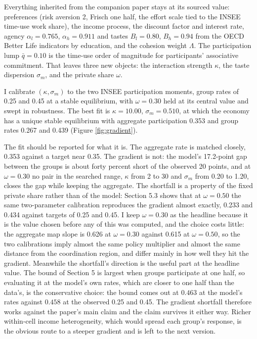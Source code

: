\documentclass[11pt]{article}
\begin{document}
Everything inherited from the companion paper stays at its sourced value: preferences (risk aversion 2, Frisch one half, the effort scale tied to the INSEE time-use work share), the income process, the discount factor and interest rate, agency $\alpha_l = 0.765$, $\alpha_h = 0.911$ and tastes $B_l = 0.80$, $B_h = 0.94$ from the OECD Better Life indicators by education, and the cohesion weight $\Lambda$. The participation lump $\bar{q} = 0.10$ is the time-use order of magnitude for participants' associative commitment. That leaves three new objects: the interaction strength $\kappa$, the taste dispersion $\sigma_m$, and the private share $\omega$.

I calibrate $(\kappa, \sigma_m)$ to the two INSEE participation moments, group rates of 0.25 and 0.45 at a stable equilibrium, with $\omega = 0.30$ held at its central value and swept in robustness. The best fit is $\kappa = 10.00$, $\sigma_m = 0.510$, at which the economy has a unique stable equilibrium with aggregate participation 0.353 and group rates 0.267 and 0.439 (Figure \ref{fig:gradient}).

The fit should be reported for what it is. The aggregate rate is matched closely, 0.353 against a target near 0.35. The gradient is not: the model's 17.2-point gap between the groups is about forty percent short of the observed 20 points, and at $\omega = 0.30$ no pair in the searched range, $\kappa$ from 2 to 30 and $\sigma_m$ from 0.20 to 1.20, closes the gap while keeping the aggregate. The shortfall is a property of the fixed private share rather than of the model: Section 5.3 shows that at $\omega = 0.50$ the same two-parameter calibration reproduces the gradient almost exactly, 0.233 and 0.434 against targets of 0.25 and 0.45. I keep $\omega = 0.30$ as the headline because it is the value chosen before any of this was computed, and the choice costs little: the aggregate map slope is 0.626 at $\omega = 0.30$ against 0.615 at $\omega = 0.50$, so the two calibrations imply almost the same policy multiplier and almost the same distance from the coordination region, and differ mainly in how well they hit the gradient. Meanwhile the shortfall's direction is the useful part at the headline value. The bound of Section 5 is largest when groups participate at one half, so evaluating it at the model's own rates, which are closer to one half than the data's, is the conservative choice: the bound comes out at $0.463$ at the model's rates against $0.458$ at the observed 0.25 and 0.45. The gradient shortfall therefore works against the paper's main claim and the claim survives it either way. Richer within-cell income heterogeneity, which would spread each group's response, is the obvious route to a steeper gradient and is left to the next version.
\end{document}
